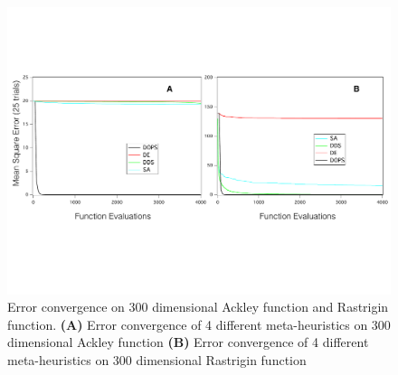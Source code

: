 \documentclass[12pt]{article}
\begin{document}
\begin{figure}[ht]
\centering
\includegraphics[width=1.00\textwidth,height=0.5\textheight]{./figs/Figure_6_Ackley_Rast}
\caption{Error convergence on 300 dimensional Ackley function and Rastrigin function. \textbf {(A)} Error convergence of 4 different meta-heuristics on 300 dimensional Ackley function \textbf {(B)} Error convergence of 4 different meta-heuristics on 300 dimensional Rastrigin function
}\label{fig-testfunctions}
\end{figure}
\end{document}
